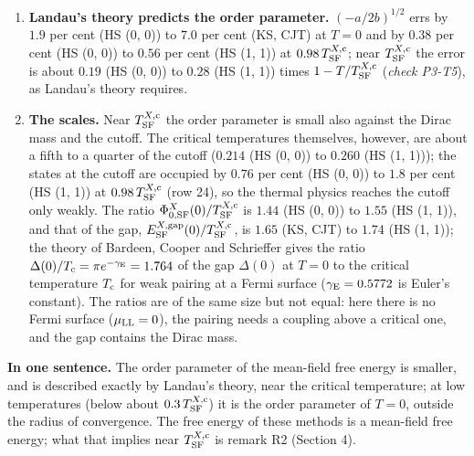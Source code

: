 \documentclass[
  10pt,
]{article}
\begin{document}
\begin{enumerate}
  Ginzburg and Landau) is \(2.8\) per cent (HS (0, 0)) to \(5.9\) per
  cent (HS (1, 1)) at \(T=0\) and \(0.26\) per cent (HS (0, 0)) to
  \(0.37\) per cent (HS (1, 1)) at \(0.98\,T^{X,{\rm c}}_{\rm SF}\);
  near \(T^{X,{\rm c}}_{\rm SF}\) it falls in proportion to
  \(1-T/T^{X,{\rm c}}_{\rm SF}\) (\emph{check P3-T6}). The normalized
  free energy approaches the curve \(x^4-2x^2\) (Figure A1c).
\item
  \textbf{Landau's theory predicts the order parameter.}
  \((-a/2b)^{1/2}\) errs by \(1.9\) per cent (HS (0, 0)) to \(7.0\) per
  cent (KS, CJT) at \(T=0\) and by \(0.38\) per cent (HS (0, 0)) to
  \(0.56\) per cent (HS (1, 1)) at \(0.98\,T^{X,{\rm c}}_{\rm SF}\);
  near \(T^{X,{\rm c}}_{\rm SF}\) the error is about \(0.19\) (HS (0,
  0)) to \(0.28\) (HS (1, 1)) times \(1-T/T^{X,{\rm c}}_{\rm SF}\)
  (\emph{check P3-T5}), as Landau's theory requires.
\item
  \textbf{The scales.} Near \(T^{X,{\rm c}}_{\rm SF}\) the order
  parameter is small also against the Dirac mass and the cutoff. The
  critical temperatures themselves, however, are about a fifth to a
  quarter of the cutoff (\(0.214\) (HS (0, 0)) to \(0.260\) (HS (1,
  1))); the states at the cutoff are occupied by \(0.76\) per cent (HS
  (0, 0)) to \(1.8\) per cent (HS (1, 1)) at
  \(0.98\,T^{X,{\rm c}}_{\rm SF}\) (row 24), so the thermal physics
  reaches the cutoff only weakly. The ratio
  \(\Phi^X_{0,{\rm SF}}(0)/T^{X,{\rm c}}_{\rm SF}\) is \(1.44\) (HS (0,
  0)) to \(1.55\) (HS (1, 1)), and that of the gap,
  \(E^{X,{\rm gap}}_{\rm SF}(0)/T^{X,{\rm c}}_{\rm SF}\), is \(1.65\)
  (KS, CJT) to \(1.74\) (HS (1, 1)); the theory of Bardeen, Cooper and
  Schrieffer gives the ratio
  \(\Delta(0)/T_{\rm c}=\pi e^{-\gamma_{\rm E}}=1.764\) of the gap
  \(\Delta(0)\) at \(T=0\) to the critical temperature \(T_{\rm c}\) for
  weak pairing at a Fermi surface (\(\gamma_{\rm E}=0.5772\) is Euler's
  constant). The ratios are of the same size but not equal: here there
  is no Fermi surface (\(\mu_{\rm LL}=0\)), the pairing needs a coupling
  above a critical one, and the gap contains the Dirac mass.
\end{enumerate}

\textbf{In one sentence.} The order parameter of the mean-field free
energy is smaller, and is described exactly by Landau's theory, near the
critical temperature; at low temperatures (below about
\(0.3\,T^{X,{\rm c}}_{\rm SF}\)) it is the order parameter of \(T=0\),
outside the radius of convergence. The free energy of these methods is a
mean-field free energy; what that implies near
\(T^{X,{\rm c}}_{\rm SF}\) is remark R2 (Section 4).
\end{document}
